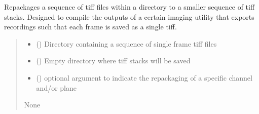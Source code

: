 \documentclass[letterpaper,10pt,english]{sphinxmanual}
\begin{document}
\begin{fulllineitems}
\label{\detokenize{CalSciPy.io:CalSciPy.io.repackage_bruker_tiffs}}
\pysigstartsignatures
{}
\pysigstopsignatures
\sphinxAtStartPar
Repackages a sequence of tiff files within a directory to a smaller sequence
of tiff stacks.
Designed to compile the outputs of a certain imaging utility
that exports recordings such that each frame is saved as a single tiff.
\begin{quote}\begin{description}
\begin{itemize}
\item {} 
\sphinxAtStartPar
{} (\sphinxstyleliteralemphasis{\sphinxupquote{{[}}}\sphinxstyleliteralemphasis{\sphinxupquote{, }}\sphinxstyleliteralemphasis{\sphinxupquote{{]}}}) \sphinxhyphen{}\sphinxhyphen{} Directory containing a sequence of single frame tiff files

\item {} 
\sphinxAtStartPar
{} (\sphinxstyleliteralemphasis{\sphinxupquote{{[}}}\sphinxstyleliteralemphasis{\sphinxupquote{, }}\sphinxstyleliteralemphasis{\sphinxupquote{{]}}}) \sphinxhyphen{}\sphinxhyphen{} Empty directory where tiff stacks will be saved

\item {} 
\sphinxAtStartPar
{} () \sphinxhyphen{}\sphinxhyphen{} optional argument to indicate the repackaging of a specific channel and/or plane

\end{itemize}

\sphinxAtStartPar
None

\end{description}\end{quote}

\end{fulllineitems}
\end{document}
